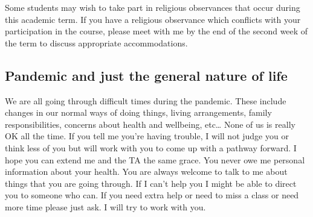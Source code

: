 \documentclass[
]{book}
\begin{document}
Some students may wish to take part in religious observances that occur during this academic term. If you have a religious observance which conflicts with your participation in the course, please meet with me by the end of the second week of the term to discuss appropriate accommodations.

\hypertarget{pandemic-and-just-the-general-nature-of-life}{%
\subsection{Pandemic and just the general nature of life}\label{pandemic-and-just-the-general-nature-of-life}}

We are all going through difficult times during the pandemic. These include changes in our normal ways of doing things, living arrangements, family responsibilities, concerns about health and wellbeing, etc\ldots{} None of us is really OK all the time. If you tell me you're having trouble, I will not judge you or think less of you but will work with you to come up with a pathway forward. I hope you can extend me and the TA the same grace. You never owe me personal information about your health. You are always welcome to talk to me about things that you are going through. If I can't help you I might be able to direct you to someone who can. If you need extra help or need to miss a class or need more time please just ask. I will try to work with you.

  
\end{document}
